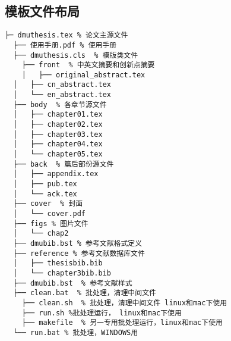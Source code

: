 \subsection{模板文件布局}
\label{sec:layout}

\begin{lstlisting}[basicstyle=\small\ttfamily,caption={模板文件布局},label=layout,numbers=none]
  ├─ dmuthesis.tex % 论文主源文件
  ├── 使用手册.pdf % 使用手册
  ├── dmuthesis.cls  % 模版类文件
	├── front  % 中英文摘要和创新点摘要
	│   ├── original_abstract.tex
  │   ├── cn_abstract.tex
  │   └── en_abstract.tex
  ├── body  % 各章节源文件
  │   ├── chapter01.tex
  │   ├── chapter02.tex
  │   ├── chapter03.tex
  │   ├── chapter04.tex
  │   └── chapter05.tex
  ├── back  % 篇后部份源文件
  │   ├── appendix.tex
  │   ├── pub.tex
  │   └── ack.tex
  ├── cover  % 封面
  │   └── cover.pdf
  ├── figs % 图片文件
  │   └── chap2
  ├── dmubib.bst % 参考文献格式定义
  ├── reference % 参考文献数据库文件
  │   ├── thesisbib.bib
  │   └── chapter3bib.bib
  ├── dmubib.bst  % 参考文献样式
  ├── clean.bat  % 批处理，清理中间文件
	├── clean.sh  % 批处理，清理中间文件 linux和mac下使用
	├── run.sh %批处理运行， linux和mac下使用
	├── makefile  % 另一专用批处理运行，linux和mac下使用
  └── run.bat % 批处理，WINDOWS用
\end{lstlisting}
